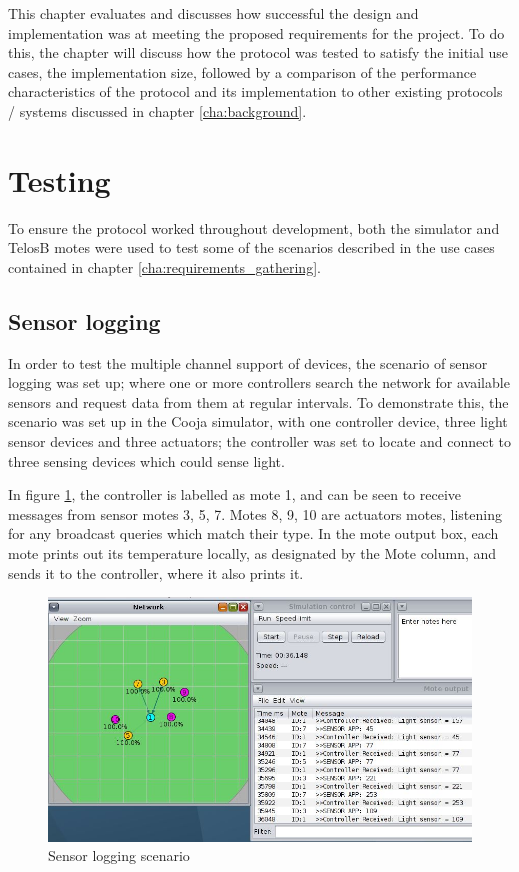 This chapter evaluates and discusses how successful the design and implementation was at meeting the proposed requirements for the project. To do this, the chapter will discuss how the protocol was tested to satisfy the initial use cases, the implementation size, followed by a comparison of the performance characteristics of the protocol and its implementation to other existing protocols / systems discussed in chapter \ref{cha:background}.


\section{Testing} %
\label{sec:testing}
To ensure the protocol worked throughout development, both the simulator and TelosB motes were used to test some of the scenarios described in the use cases contained in chapter \ref{cha:requirements_gathering}.
\subsection{Sensor logging} %
\label{sub:sensor_logging}
In order to test the multiple channel support of devices, the scenario of sensor logging was set up; where one or more controllers search the network for available sensors and request data from them at regular intervals.
To demonstrate this, the scenario was set up in the Cooja simulator, with one controller device, three light sensor devices and three actuators; the controller was set to locate and connect to three sensing devices which could sense light.

In figure \ref{fig:logtest}, the controller is labelled as mote 1, and can be seen to receive messages from sensor motes 3, 5, 7. Motes 8, 9, 10 are actuators motes, listening for any broadcast queries which match their type. In the mote output box, each mote prints out its temperature locally, as designated by the Mote column, and sends it to the controller, where it also prints it.

\begin{figure}[h]
\centering
\includegraphics[scale=0.5]{evaluation/img/logTest.jpg}
\caption{Sensor logging scenario}
\label{fig:logtest}
\end{figure}  

